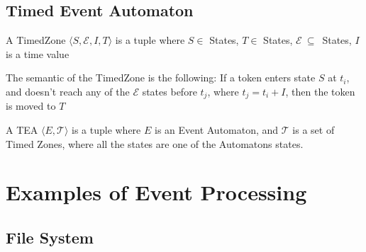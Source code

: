 		\subsection{Timed Event Automaton}
			
				
			\begin{dfn}
				A TimedZone $\langle S,\mathcal{E},I,T \rangle $ is a tuple where $S \in$ States,
				$T \in$ States, 
				$\mathcal{E}~\subseteq$~States,
				$I$ is a time value 
			\end{dfn}
			
			The semantic of the TimedZone is the following: 
				If a token enters state $S$ at $t_i$, and doesn't reach any of the $\mathcal{E}$ states before $t_j$,
				where $t_j = t_i + I$, then the token is moved to $T$
				
			\begin{dfn}
				A TEA
				$\langle E,\mathcal{T} \rangle$ is a tuple where $E$ is an Event Automaton, and $\mathcal{T}$ is a set of Timed Zones, where all the states are one of the 
				Automatons states.
			\end{dfn}

	\section{Examples of Event Processing}
 
		\subsection{File System}
